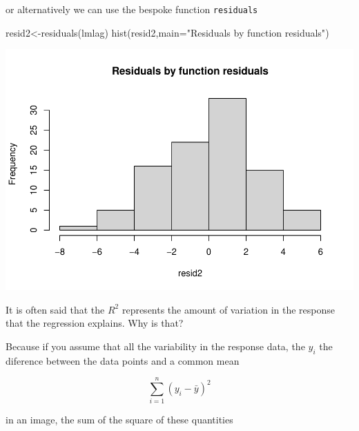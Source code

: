 \documentclass[
]{book}
\newenvironment{Shaded}{\begin{snugshade}}{\end{snugshade}}
\newcommand{\AttributeTok}[1]{\textcolor[rgb]{0.77,0.63,0.00}{#1}}
\newcommand{\CommentTok}[1]{\textcolor[rgb]{0.56,0.35,0.01}{\textit{#1}}}
\newcommand{\DecValTok}[1]{\textcolor[rgb]{0.00,0.00,0.81}{#1}}
\newcommand{\FunctionTok}[1]{\textcolor[rgb]{0.00,0.00,0.00}{#1}}
\newcommand{\NormalTok}[1]{#1}
\newcommand{\OtherTok}[1]{\textcolor[rgb]{0.56,0.35,0.01}{#1}}
\newcommand{\SpecialCharTok}[1]{\textcolor[rgb]{0.00,0.00,0.00}{#1}}
\newcommand{\StringTok}[1]{\textcolor[rgb]{0.31,0.60,0.02}{#1}}
\begin{document}
or alternatively we can use the bespoke function \texttt{residuals}

\begin{Shaded}
\begin{Highlighting}[]
\NormalTok{resid2}\OtherTok{\textless{}{-}}\FunctionTok{residuals}\NormalTok{(lmlag)}
\FunctionTok{hist}\NormalTok{(resid2,}\AttributeTok{main=}\StringTok{"Residuals by function residuals"}\NormalTok{)}
\end{Highlighting}
\end{Shaded}

\includegraphics{ECOMODbook_files/figure-latex/a6.13-1.pdf}

It is often said that the \(R^2\) represents the amount of variation in the response that the regression explains. Why is that?

Because if you assume that all the variability in the response data, the \(y_i\) the diference between the data points and a common mean

\[\sum_{i=1}^n (y_i- \bar y)^2\]

in an image, the sum of the square of these quantities

\begin{Shaded}
\end{Shaded}
\end{document}

